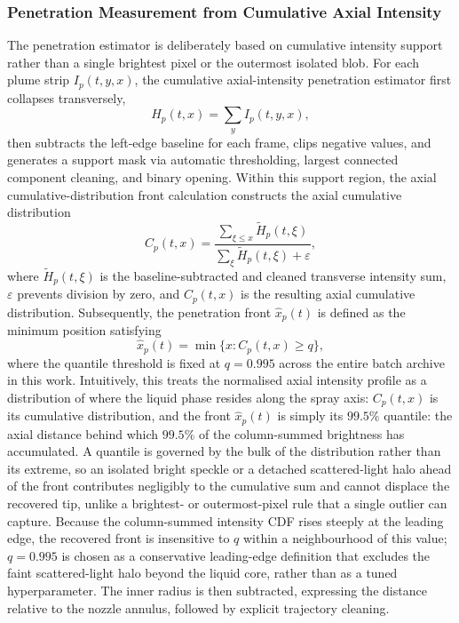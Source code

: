 \subsubsection{Penetration Measurement from Cumulative Axial Intensity}\label{subsec:penetration-measurement}

The penetration estimator is deliberately based on cumulative intensity support rather than a single brightest pixel or the outermost isolated blob.
For each plume strip \(I_p(t,y,x)\), the cumulative axial-intensity penetration estimator first collapses transversely,
\[
H_p(t,x)=\sum_y I_p(t,y,x),
\]
then subtracts the left-edge baseline for each frame, clips negative values, and generates a support mask via automatic thresholding, largest connected component cleaning, and binary opening.
Within this support region, the axial cumulative-distribution front calculation constructs the axial cumulative distribution
\[
C_p(t,x)=\frac{\sum_{\xi \le x} \tilde{H}_p(t,\xi)}{\sum_{\xi} \tilde{H}_p(t,\xi)+\varepsilon},
\]
where \(\tilde{H}_p(t,\xi)\) is the baseline-subtracted and cleaned transverse intensity sum, \(\varepsilon\) prevents division by zero, and \(C_p(t,x)\) is the resulting axial cumulative distribution.
Subsequently, the penetration front \(\hat{x}_p(t)\) is defined as the minimum position satisfying
\[
\hat{x}_p(t)=\min \{x : C_p(t,x)\ge q\},
\]
where the quantile threshold is fixed at \(q=0.995\) across the entire batch archive in this work.
Intuitively, this treats the normalised axial intensity profile as a distribution of where the liquid phase resides along the spray axis: \(C_p(t,x)\) is its cumulative distribution, and the front \(\hat{x}_p(t)\) is simply its \(99.5\%\) quantile: the axial distance behind which \(99.5\%\) of the column-summed brightness has accumulated.
A quantile is governed by the bulk of the distribution rather than its extreme, so an isolated bright speckle or a detached scattered-light halo ahead of the front contributes negligibly to the cumulative sum and cannot displace the recovered tip, unlike a brightest- or outermost-pixel rule that a single outlier can capture.
Because the column-summed intensity CDF rises steeply at the leading edge, the recovered front is insensitive to \(q\) within a neighbourhood of this value; \(q=0.995\) is chosen as a conservative leading-edge definition that excludes the faint scattered-light halo beyond the liquid core, rather than as a tuned hyperparameter.
The inner radius is then subtracted, expressing the distance relative to the nozzle annulus, followed by explicit trajectory cleaning.
